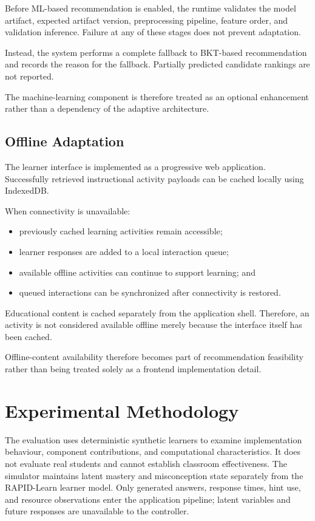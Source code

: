 \documentclass[conference]{IEEEtran}
\begin{document}
Before ML-based recommendation is enabled, the runtime validates the model artifact, expected artifact version, preprocessing pipeline, feature order, and validation inference. Failure at any of these stages does not prevent adaptation.

Instead, the system performs a complete fallback to BKT-based recommendation and records the reason for the fallback. Partially predicted candidate rankings are not reported.

The machine-learning component is therefore treated as an optional enhancement rather than a dependency of the adaptive architecture.

\subsection{Offline Adaptation}

The learner interface is implemented as a progressive web application. Successfully retrieved instructional activity payloads can be cached locally using IndexedDB.

When connectivity is unavailable:

\begin{itemize}
    \item previously cached learning activities remain accessible;
    \item learner responses are added to a local interaction queue;
    \item available offline activities can continue to support learning; and
    \item queued interactions can be synchronized after connectivity is restored.
\end{itemize}

Educational content is cached separately from the application shell. Therefore, an activity is not considered available offline merely because the interface itself has been cached.

Offline-content availability therefore becomes part of recommendation feasibility rather than being treated solely as a frontend implementation detail.

\section{Experimental Methodology}

The evaluation uses deterministic synthetic learners to examine implementation
behaviour, component contributions, and computational characteristics. It does
not evaluate real students and cannot establish classroom effectiveness. The
simulator maintains latent mastery and misconception state separately from the
RAPID-Learn learner model. Only generated answers, response times, hint use,
and resource observations enter the application pipeline; latent variables and
future responses are unavailable to the controller.
\end{document}

